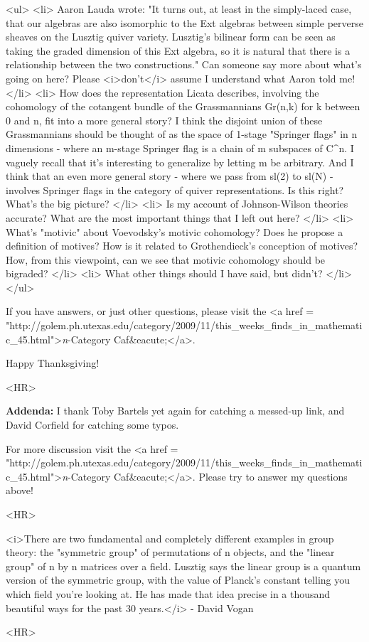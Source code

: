 <ul>
<li>
Aaron Lauda wrote: "It turns out, at least in the simply-laced case,
that our algebras are also isomorphic to the Ext algebras between
simple perverse sheaves on the Lusztig quiver variety.  Lusztig's
bilinear form can be seen as taking the graded dimension of this Ext
algebra, so it is natural that there is a relationship between the two
constructions."  Can someone say more about what's going on here?
Please <i>don't</i> assume I understand what Aaron told me!
</li>
<li>
How does the representation Licata describes, involving the cohomology
of the cotangent bundle of the Grassmannians Gr(n,k) for k between 0
and n, fit into a more general story?  I think the disjoint union of
these Grassmannians should be thought of as the space of 1-stage
"Springer flags" in n dimensions - where an m-stage Springer flag is a
chain of m subspaces of C^{n}.  I vaguely recall that it's
interesting to generalize by letting m be arbitrary.  And I think that
an even more general story - where we pass from sl(2) to sl(N) -
involves Springer flags in the category of quiver representations.  Is
this right?  What's the big picture?
</li>
<li>
Is my account of Johnson-Wilson theories accurate?  What are the most 
important things that I left out here?
</li>
<li>
What's "motivic" about Voevodsky's motivic cohomology?  Does he propose a 
definition of motives?  How is it related to Grothendieck's conception of 
motives?  How, from this viewpoint, can we see that motivic cohomology 
should be bigraded?
</li>
<li>
What other things should I have said, but didn't?
</li>
</ul>

If you have answers, or just other questions, please visit
the <a href = "http://golem.ph.utexas.edu/category/2009/11/this_weeks_finds_in_mathematic_45.html">\emph{n}-Category
Caf&eacute;</a>.  

Happy Thanksgiving!

<HR>

\textbf{Addenda:} I thank Toby Bartels yet again for catching a
messed-up link, and David Corfield for catching some typos.

For more discussion visit the <a href =
"http://golem.ph.utexas.edu/category/2009/11/this_weeks_finds_in_mathematic_45.html">\emph{n}-Category
Caf&eacute;</a>.  Please try to answer my questions above!


<HR>


<i>There are two fundamental and completely different examples in group
theory: the "symmetric group" of permutations of n objects, and the
"linear group" of n by n matrices over a field.  Lusztig says the
linear group is a quantum version of the symmetric group, with 
the value of Planck's constant
telling you which field you're looking at.  He has made that idea
precise in a thousand beautiful ways for the past 30 years.</i> - David Vogan
 
<HR>



